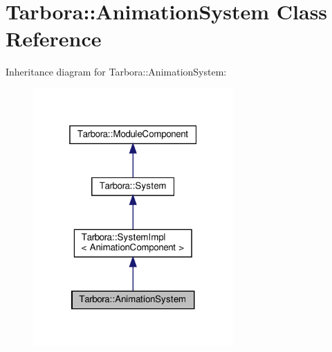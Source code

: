 \hypertarget{classTarbora_1_1AnimationSystem}{}\section{Tarbora\+:\+:Animation\+System Class Reference}
\label{classTarbora_1_1AnimationSystem}


Inheritance diagram for Tarbora\+:\+:Animation\+System\+:
\nopagebreak
\begin{figure}[H]
\begin{center}
\leavevmode
\includegraphics[width=217pt]{classTarbora_1_1AnimationSystem__inherit__graph}
\end{center}
\end{figure}


